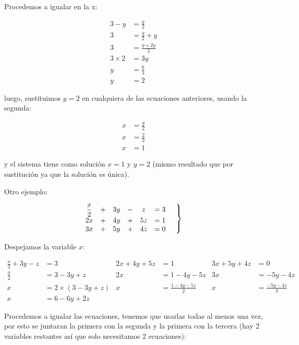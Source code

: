     Procedemos a igualar en la x:

    \begin{align*}
        3-y &= 	\frac{y}{2} 	\\
        3 &= \frac{y}{2}+y \\
        3 &= \frac{y+2y}{2} \\
        3\times2 &= 3y \\
        y &= \frac{6}{3} \\
        y&=2
    \end{align*}

    luego, sustituimos $y=2$ en cualquiera de las ecuaciones anteriores, usando
    la segunda:

    \begin{align*}
        x&= \frac{y}{2}  		\\
        x&= \frac{2}{2} \\
        x&=1
    \end{align*}

    y el sistema tiene como solución $ x=1 $ y $ y=2 $ (mismo resultado que por
    sustitución ya que la   solución es única).

    Otro ejemplo:

   \begin{equation*}
        \left.
        \begin{matrix}
            \displaystyle\frac{x}{2} &+& 3y &-& z &= 3 \\
            2x &+& 4y &+&5z &= 1\\
            3x &+& 5y &+& 4z &=0
        \end{matrix}
        \hspace*{0.5cm}\right\rbrace
    \end{equation*}

    Despejamos la variable $x$:

    \begin{align*}
        \displaystyle\frac{x}{2} +3y-z &=3   & 2x+4y+5z &= 1             & 3x+5y+4z &= 0 \\
        \displaystyle\frac{x}{2} &= 3-3y+z   & 2x &= 1-4y-5z             & 3x &= -5y-4z  \\
        x&= 2\times(3-3y+z)     & x &= \frac{1-4y-5z}{2}    & x &= \frac{-5y-4z}{3} \\
        x&= 6-6y+2z
    \end{align*}


    Procedemos a igualar las ecuaciones, tenemos que usarlas todas al menos una
    vez, por esto se juntaran la primera con la segunda y la primera con la tercera
    (hay 2 variables restantes así que solo necesitamos 2 ecuaciones):

